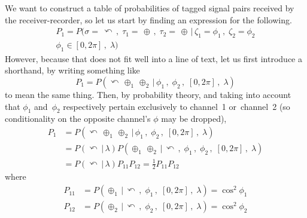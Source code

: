 \documentclass[9pt,technote]{IEEEtran}
\begin{document}
We want to construct a table of probabilities of tagged signal pairs
received by the receiver-recorder, so let us start by finding an
expression for the following.
\begin{multline}
  P_1 = P(\sigma=\,\curvearrowleft\,,\; \tau_1=\,\oplus\,,\; \tau_2=\,\oplus \,|\,
  \zeta_1=\phi_1\,,\; \zeta_2=\phi_2 \\ \phi_1\in[0,2\pi]\,,\; \lambda)
\end{multline}
However, because that does not fit well into a line of text, let us
first introduce a shorthand, by writing something like
\begin{equation}
  P_1 = P(\curvearrowleft\,\oplus_1\,\oplus_2\,|\,\phi_1\,,\; \phi_2\,,\;
  [0,2\pi]\,,\; \lambda)
\end{equation}
to mean the same thing. Then, by probability theory, and taking into
account that $\phi_1$ and~$\phi_2$ respectively pertain exclusively to
channel~1 or~channel~2 (so conditionality on the opposite channel's
$\phi$ may be dropped),
\begin{align}
  P_1 &= P(\curvearrowleft\,\oplus_1\,\oplus_2\,|\,\phi_1\,,\; \phi_2\,,\; [0,2\pi]\,,\; \lambda) \\
      &= P(\curvearrowleft\,|\, \lambda) P(\oplus_1\,\oplus_2\,|\,\curvearrowleft\,,\;\phi_1\,,\; \phi_2\,,\; [0,2\pi]\,,\; \lambda) \\
      &= P(\curvearrowleft\,|\, \lambda) P_{11} P_{12} = \frac{1}{2} P_{11} P_{12}
\end{align}
where
\begin{align}
  P_{11} &= P(\oplus_1\,|\,\curvearrowleft\,,\;\phi_1\,,\; [0,2\pi]\,,\; \lambda) = \cos^2 \phi_1 \\
  P_{12} &= P(\oplus_2\,|\,\curvearrowleft\,,\; \phi_2\,,\; [0,2\pi]\,,\; \lambda) = \cos^2 \phi_2
\end{align}
\end{document}
